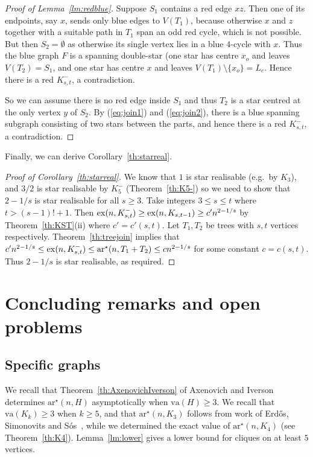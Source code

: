 \documentclass[a4paper, 12pt]{article}
\numberwithin{equation}{section}
\def\sm{{\setminus}}
\def\sar{{\mathrm{ar}^{\star}}}
\def\va{{\mathrm{va}}}
\begin{document}
\begin{proof}[Proof of Lemma~\ref{lm:redblue}]
 Suppose $S_1$ contains a red edge $xz$.
 Then one of its endpoints, say $x$, sends only blue edges to $V(T_1)$, because otherwise $x$ and $z$ together with a suitable path in $T_1$ span an odd red cycle, which is not possible.
But then $S_2 = \emptyset$ as otherwise its single vertex lies in a blue $4$-cycle with $x$. Thus the blue graph $F$ is a spanning double-star (one star has centre $x_o$ and leaves $V(T_2) = S_1$, and one star has centre $x$ and leaves $V(T_1) \sm \{x_o\} = L_e$.
Hence there is a red $K_{s,t}^-$, a contradiction.

So we can assume there is no red edge inside $S_1$ and thus
$T_2$ is a star centred at the only vertex $y$ of $S_2$.
By (\ref{eq:join1}) and (\ref{eq:join2}), there is a blue spanning subgraph consisting of two stars between the parts, and hence there is a red $K_{s,t}^-$, a contradiction.
\end{proof}




Finally, we can derive Corollary~\ref{th:starreal}.

\begin{proof}[Proof of Corollary~\ref{th:starreal}]
We know that $1$ is star realisable (e.g.~by $K_3$), 
and $3/2$ is star realisable by $K_5^-$ (Theorem~\ref{th:K5-})
so we need to show that $2-1/s$ is star realisable for all $s \geq 3$.
Take integers $3 \leq s \leq t$ where $t>(s-1)!+1$. Then ${\rm ex}(n,K_{s,t}^-) \geq {\rm ex}(n,K_{s,t-1}) \geq c'n^{2-1/s}$ by Theorem~\ref{th:KST}(ii) where $c'=c'(s,t)$.
Let $T_1,T_2$ be trees with $s,t$ vertices respectively.
Theorem~\ref{th:treejoin} implies that $c'n^{2-1/s} \leq {\rm ex}(n,K_{s,t}^-) \le \sar(n,T_1+T_2) \leq cn^{2-1/s}$ for some constant $c=c(s,t)$. 
Thus $2-1/s$ is star realisable, as required.
\end{proof}



\section{Concluding remarks and open problems}\label{sec:conclude}


\subsection{Specific graphs}
We recall that Theorem~\ref{th:AxenovichIverson} of Axenovich and Iverson determines $\sar(n,H)$ asymptotically when $\va(H) \geq 3$.
We recall that $\va(K_k) \geq 3$ when $k \geq 5$, and that $\sar(n,K_3)$ follows from work of Erd\H{o}s, Simonovits and S\'os~\cite{ErdosSimonovitsSos}, while we determined the exact value of $\sar(n,K_4)$ (see Theorem~\ref{th:K4}).
Lemma~\ref{lm:lower} gives a lower bound for cliques on at least $5$ vertices.
\end{document}
